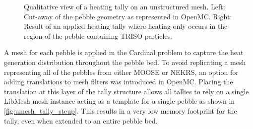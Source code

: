\begin{figure}
    \centering
    \hspace*{.2in}
    \caption{Qualitative view of a heating tally on an unstructured mesh. Left: Cut-away of the pebble geometry as represented in OpenMC. Right: Result of an applied heating tally where heating only occurs in the region of the pebble containing TRISO particles.}
    \label{fig:pebble_umesh}
\end{figure}

A mesh for each pebble is applied in the Cardinal problem to capture the heat generation distribution throughout the pebble bed. To avoid replicating a mesh representing all of the pebbles from either MOOSE or NEKRS, an option for adding translations to mesh filters was introduced in OpenMC. Placing the translation at this layer of the tally structure allows all tallies to rely on a single LibMesh mesh  instance acting as a template for a single pebble as shown in \autoref{fig:umesh_tally_steup}. This results in a very low memory footprint for the tally, even when extended to an entire pebble bed.

